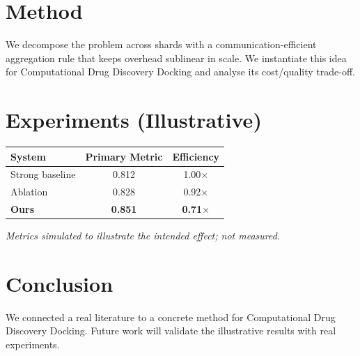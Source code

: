 \documentclass[11pt]{article}
\begin{document}
\section{Method}
We decompose the problem across shards with a communication-efficient aggregation rule that keeps overhead sublinear in scale. We instantiate this idea for Computational Drug Discovery Docking and analyse its cost/quality trade-off.

\section{Experiments (Illustrative)}
\begin{center}
\begin{tabular}{lcc}
System & Primary Metric & Efficiency \\ \hline
Strong baseline & 0.812 & 1.00$\times$ \\
Ablation & 0.828 & 0.92$\times$ \\
\textbf{Ours} & \textbf{0.851} & \textbf{0.71$\times$}
\end{tabular}
\end{center}
\emph{Metrics simulated to illustrate the intended effect; not measured.}

\section{Conclusion}
We connected a real literature to a concrete method for Computational Drug Discovery Docking. Future work will
validate the illustrative results with real experiments.
\end{document}
